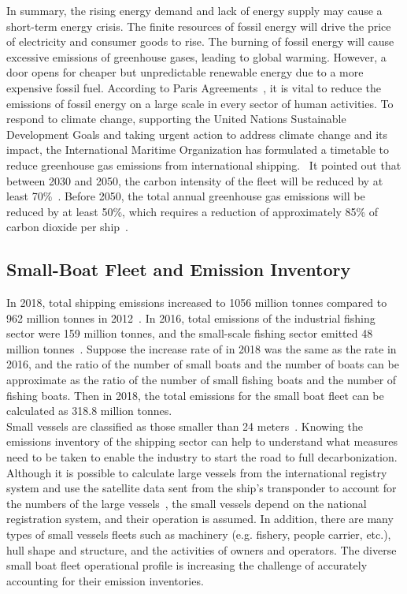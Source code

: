 In summary, the rising energy demand and lack of energy supply may cause a short-term energy crisis. The finite resources of fossil energy will drive the price of electricity and consumer goods to rise. The burning of fossil energy will cause excessive emissions of greenhouse gases, leading to global warming. However, a door opens for cheaper but unpredictable renewable energy due to a more expensive fossil fuel. According to Paris Agreements~\cite{unies2015accord}, it is vital to reduce the emissions of fossil energy on a large scale in every sector of human activities. To respond to climate change, supporting the United Nations Sustainable Development Goals and taking urgent action to address climate change and its impact, the International Maritime Organization has formulated a timetable to reduce greenhouse gas emissions from international shipping.~\cite{joung2020imo} It pointed out that between 2030 and 2050, the carbon intensity of the fleet will be reduced by at least 70\%~\cite{joung2020imo}. Before 2050, the total annual greenhouse gas emissions will be reduced by at least 50\%, which requires a reduction of approximately 85\% of carbon dioxide per ship~\cite{joung2020imo}.\\ 

\newpage
\subsection{Small-Boat Fleet and Emission Inventory}
In 2018, total shipping  emissions increased to 1056 million tonnes compared to 962 million tonnes in 2012~\cite{IMO2021Fourth}.
In 2016, total  emissions of the industrial fishing sector were 159 million tonnes, and the small-scale fishing sector emitted 48 million tonnes~\cite{GREER2019103382}. Suppose the increase rate of  in 2018 was the same as the rate in 2016, and the ratio of the number of small boats and the number of boats can be approximate as the ratio of the number of small fishing boats and the number of fishing boats. Then in 2018, the total  emissions for the small boat fleet can be calculated as 318.8 million tonnes.\\

Small vessels are classified as those smaller than 24 meters~\cite{uk2021Operational}. Knowing the emissions inventory of the shipping sector can help to understand what measures need to be taken to enable the industry to start the road to full decarbonization. Although it is possible to calculate large vessels from the international registry system and use the satellite data sent from the ship's transponder to account for the numbers of the large vessels~\cite{IMO2021Fourth}, the small vessels depend on the national registration system, and their operation is assumed. In addition, there are many types of small vessels fleets such as machinery (e.g. fishery, people carrier, etc.), hull shape and structure, and the activities of owners and operators. The diverse small boat fleet operational profile is increasing the challenge of accurately accounting for their emission inventories.\\

